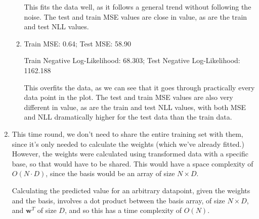 \documentclass[submit]{harvardml}
\begin{document}
\begin{enumerate}
\begin{enumerate}[a]
    This fits the data well, as it follows a general trend without following the noise. The test and train MSE values are close in value, as are the train and test NLL values.
    
    \item
    Train MSE: 0.64; Test MSE: 58.90
    
    Train Negative Log-Likelihood: 68.303; Test Negative Log-Likelihood: 1162.188

    This overfits the data, as we can see that it goes through practically every data point in the plot. The test and train MSE values are also very different in value, as are the train and test NLL values, with both MSE and NLL dramatically higher for the test data than the train data.
    \end{enumerate}

\item
    This time round, we don't need to share the entire training set with them, since it's only needed to calculate the weights (which we've already fitted.) However, the weights were calculated using transformed data with a specific base, so that would have to be shared. This would have a space complexity of $O(N \cdot D)$, since the basis would be an array of size $N \times D$.

    Calculating the predicted value for an arbitrary datapoint, given the weights and the basis, involves a dot product between the basis array, of size $N \times D$, and $\textbf{w}^T$ of size $D$, and so this has a time complexity of $O(N)$.
\end{enumerate}
\end{document}
